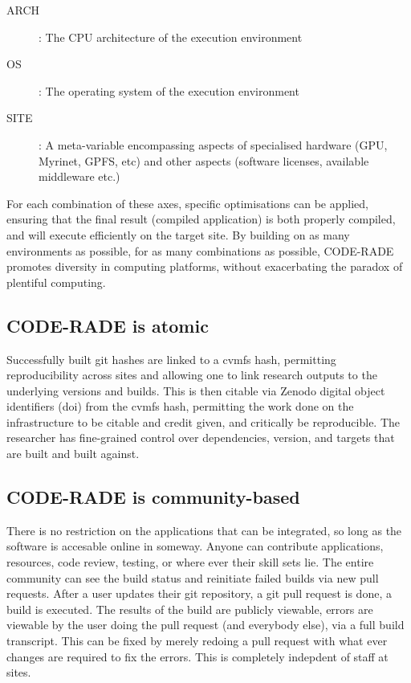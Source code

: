 \documentclass[a4paper]{jpconf}
\begin{document}
\begin{description}
	\item[ARCH]: The CPU architecture of the execution environment
	\item[OS]: The operating system of the execution environment
    \item[SITE]: A meta-variable encompassing aspects of specialised hardware (GPU, Myrinet, GPFS,
        etc) and other aspects (software licenses, available middleware etc.)
\end{description}

For each combination of these axes, specific optimisations can be applied, ensuring that the final
result (compiled application) is both properly compiled, and will execute efficiently on the target
site.
By building on as many environments as possible, for as many combinations as possible, CODE-RADE
promotes diversity in computing platforms, without exacerbating the paradox of plentiful computing.

\subsection{CODE-RADE is atomic}

Successfully built git hashes are linked to a cvmfs hash, permitting reproducibility across sites and 
allowing one to link research outputs to the underlying versions and builds. This is then citable via
Zenodo digital object identifiers (doi) from the cvmfs hash, permitting the work done on the 
infrastructure to be citable and credit given, and critically be reproducible.
The researcher has fine-grained control over dependencies, version, and targets that are built
and built against. 

\subsection{CODE-RADE is community-based}
There is no restriction on the applications that can be integrated, so long as the software is accesable
online in someway. Anyone can contribute applications, resources, code review, testing, or
where ever their skill sets lie. 
The entire community can see the build status and reinitiate failed builds via new pull requests.
After a user updates their git repository, a git pull request is done, a build is executed. 
The results of the build are publicly viewable, 
errors are viewable by the user doing the pull request (and everybody else), via a full build transcript.
This can be fixed
by merely redoing a pull request with what ever changes are required to fix the errors. 
This is completely indepdent of staff at sites.
\end{document}
